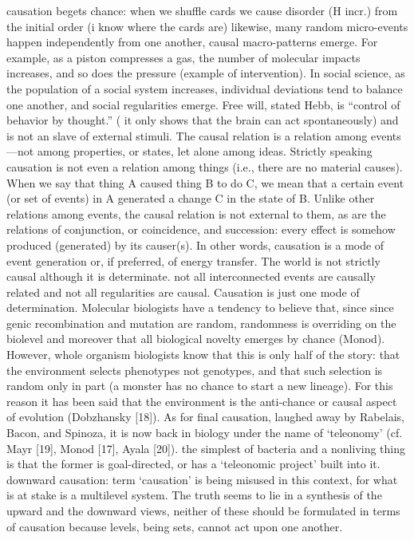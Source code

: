 \documentclass[onecollarge,runningheads]{svjour2}
\begin{document}
{%
causation begets chance: when we shuffle cards we cause disorder (H incr.) from the initial order (i know where the cards are) likewise, many random micro-events happen independently from one another, causal macro-patterns emerge. For example, as a piston compresses a gas, the number of molecular impacts increases, and so does the pressure (example of intervention). In social science, as the population of a social system increases, individual deviations tend to balance one another, and social regularities emerge. Free will, stated Hebb, is “control of behavior by thought.” ( it only shows that the brain can act spontaneously) and is not an slave of external stimuli.
The causal relation is a relation among events—not among properties, or states, let alone among ideas. Strictly speaking causation is not even a relation among things (i.e., there are no material causes). When we say that thing A caused thing B to do C, we mean that a certain event (or set of events) in A generated a change C in the state of B.
Unlike other relations among events, the causal relation is not external to them, as are the relations of conjunction, or coincidence, and succession: every effect is somehow produced (generated) by its causer(s). In other words, causation is a mode of event generation or, if preferred, of energy transfer.
The world is not strictly causal although it is determinate. not all interconnected events are causally related and not all regularities are causal. Causation is just one mode of determination.
Molecular biologists have a tendency to believe that, since since genic recombination and mutation are random, randomness is overriding on the biolevel and moreover that all biological novelty emerges by chance (Monod). However, whole organism biologists know that this is only half of the story: that the environment selects phenotypes not genotypes, and that such selection is random only in part (a monster has no chance to start a new lineage). For this reason it has been said that the environment is the anti-chance or causal aspect of evolution (Dobzhansky [18]).
As for final causation, laughed away by Rabelais, Bacon, and Spinoza, it is now back in biology under the name of ‘teleonomy’ (cf. Mayr [19], Monod [17], Ayala [20]). the simplest of bacteria and a nonliving thing is that the former is goal-directed, or has a ‘teleonomic project’ built into it. downward causation: term ‘causation’ is being misused in this context, for what is at stake is a multilevel system.
The truth seems to lie in a synthesis of the upward and the downward views, neither of these should be formulated in terms of causation because levels, being sets, cannot act upon one another.%
}
\end{document}
